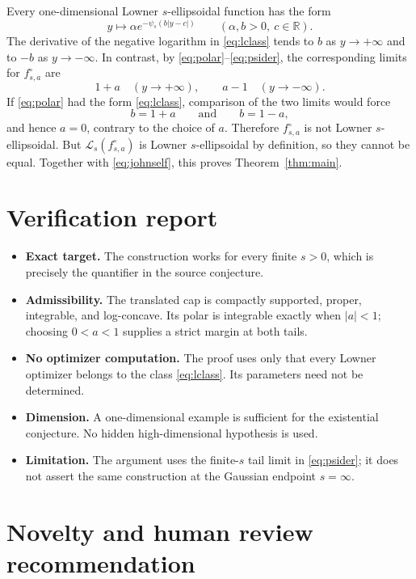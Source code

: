 \documentclass[11pt]{article}
\newcommand{\R}{\mathbb R}
\newcommand{\Lw}{\mathcal L}
\begin{document}
Every one-dimensional Lowner $s$-ellipsoidal function has the form
\begin{equation}\label{eq:lclass}
 y\longmapsto \alpha e^{-\psi_s(b|y-c|)}
 \qquad(\alpha,b>0,\ c\in\R).
\end{equation}
The derivative of the negative logarithm in \eqref{eq:lclass} tends to $b$
as $y\to+\infty$ and to $-b$ as $y\to-\infty$.  In contrast, by
\eqref{eq:polar}--\eqref{eq:psider}, the corresponding limits for
$f_{s,a}^\circ$ are
\begin{equation}\label{eq:slopes}
 1+a\quad(y\to+\infty),
 \qquad a-1\quad(y\to-\infty).
\end{equation}
If \eqref{eq:polar} had the form \eqref{eq:lclass}, comparison of the two
limits would force
\[
 b=1+a\qquad\text{and}\qquad b=1-a,
\]
and hence $a=0$, contrary to the choice of $a$.  Therefore
$f_{s,a}^\circ$ is not Lowner $s$-ellipsoidal.  But
$\Lw_s(f_{s,a}^\circ)$ is Lowner $s$-ellipsoidal by definition, so they cannot
be equal.  Together with \eqref{eq:johnself}, this proves Theorem~\ref{thm:main}.

\section{Verification report}

\begin{itemize}
\item \textbf{Exact target.}  The construction works for every finite $s>0$,
which is precisely the quantifier in the source conjecture.
\item \textbf{Admissibility.}  The translated cap is compactly supported,
proper, integrable, and log-concave.  Its polar is integrable exactly when
$|a|<1$; choosing $0<a<1$ supplies a strict margin at both tails.
\item \textbf{No optimizer computation.}  The proof uses only that every
Lowner optimizer belongs to the class \eqref{eq:lclass}.  Its parameters need
not be determined.
\item \textbf{Dimension.}  A one-dimensional example is sufficient for the
existential conjecture.  No hidden high-dimensional hypothesis is used.
\item \textbf{Limitation.}  The argument uses the finite-$s$ tail limit in
\eqref{eq:psider}; it does not assert the same construction at the Gaussian
endpoint $s=\infty$.
\end{itemize}

\section{Novelty and human review recommendation}
\end{document}
